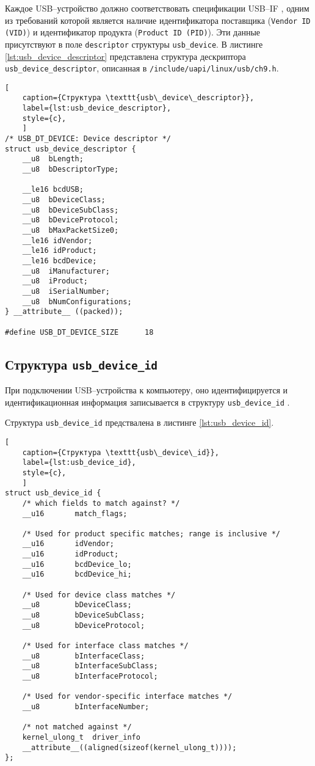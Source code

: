 Каждое USB--устройство должно соответствовать спецификации USB--IF \cite{usb_spec}, одним из требований которой является наличие идентификатора поставщика (\texttt{Vendor ID (VID)}) и идентификатор продукта (\texttt{Product ID (PID)}). Эти данные присутствуют в поле \texttt{descriptor} структуры \texttt{usb\_device}. В листинге \ref{lst:usb_device_descriptor} представлена структура дескриптора \texttt{usb\_device\_descriptor}, описанная в \texttt{/include/uapi/linux/usb/ch9.h}.

\begin{lstlisting}[
	caption={Структура \texttt{usb\_device\_descriptor}},
	label={lst:usb_device_descriptor},
	style={c},
	]
/* USB_DT_DEVICE: Device descriptor */
struct usb_device_descriptor {
	__u8  bLength;
	__u8  bDescriptorType;
	
	__le16 bcdUSB;
	__u8  bDeviceClass;
	__u8  bDeviceSubClass;
	__u8  bDeviceProtocol;
	__u8  bMaxPacketSize0;
	__le16 idVendor;
	__le16 idProduct;
	__le16 bcdDevice;
	__u8  iManufacturer;
	__u8  iProduct;
	__u8  iSerialNumber;
	__u8  bNumConfigurations;
} __attribute__ ((packed));

#define USB_DT_DEVICE_SIZE		18
\end{lstlisting}

\subsection{Структура \texttt{usb\_device\_id}}

При подключении USB--устройства к компьютеру, оно идентифицируется и идентификационная информация записывается в структуру \texttt{usb\_device\_id} \cite{usb_device_id}.

Структура \texttt{usb\_device\_id} предствалена в листинге \ref{lst:usb_device_id}.

\begin{lstlisting}[
	caption={Структура \texttt{usb\_device\_id}},
	label={lst:usb_device_id},
	style={c},
	]
struct usb_device_id {
	/* which fields to match against? */
	__u16		match_flags;
	
	/* Used for product specific matches; range is inclusive */
	__u16		idVendor;
	__u16		idProduct;
	__u16		bcdDevice_lo;
	__u16		bcdDevice_hi;
	
	/* Used for device class matches */
	__u8		bDeviceClass;
	__u8		bDeviceSubClass;
	__u8		bDeviceProtocol;
	
	/* Used for interface class matches */
	__u8		bInterfaceClass;
	__u8		bInterfaceSubClass;
	__u8		bInterfaceProtocol;
	
	/* Used for vendor-specific interface matches */
	__u8		bInterfaceNumber;
	
	/* not matched against */
	kernel_ulong_t	driver_info
	__attribute__((aligned(sizeof(kernel_ulong_t))));
};
\end{lstlisting}

